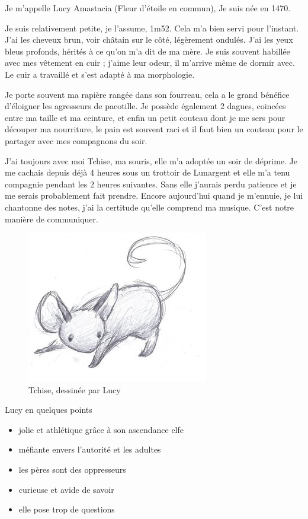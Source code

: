 \documentclass[10pt,a4paper,twoside,twocolumn,openany]{book}
\begin{document}
Je m'appelle Lucy Amastacia (Fleur d'étoile en commun), Je suis née en 1470.

Je suis relativement petite, je l'assume, 1m52. Cela m'a bien servi
pour l'instant. J'ai les cheveux brun, voir châtain sur le côté, légèrement
ondulés. J'ai les yeux bleus profonds, hérités à ce qu'on m'a dit de ma mère.
Je suis souvent habillée avec mes vêtement en cuir ; j'aime leur odeur, il m'arrive
même de dormir avec. Le cuir a travaillé et s'est adapté à ma morphologie.

Je porte souvent ma rapière rangée dans son fourreau, cela a le grand bénéfice d'éloigner
les agresseurs de pacotille. Je possède également 2 dagues, coincées
entre ma taille et ma ceinture, et enfin un petit couteau dont je me sers pour
découper ma nourriture, le pain est souvent raci et il faut bien un couteau pour le partager
avec mes compagnons du soir.

J'ai toujours avec moi Tchise, ma souris, elle m'a adoptée un soir de déprime. Je me cachais
depuis déjà 4 heures sous un trottoir de Lunargent et elle m'a tenu compagnie pendant
les 2 heures suivantes. Sans elle j'aurais perdu patience et je me serais probablement
fait prendre. Encore aujourd'hui quand je m'ennuie, je lui chantonne des notes, j'ai la
certitude qu'elle comprend ma musique. C'est notre manière de communiquer.

\begin{figure}[!h]
\centering
\includegraphics[scale=1]{tchise.png}
\caption*{Tchise, dessinée par Lucy}
\end{figure}

\begin{commentbox}{Lucy en quelques points}

\begin{itemize}
\item jolie et athlétique grâce à son ascendance elfe
\item méfiante envers l'autorité et les adultes
\item les pères sont des oppresseurs
\item curieuse et avide de savoir
\item elle pose trop de questions
\end{itemize}

\end{commentbox}
\end{document}
